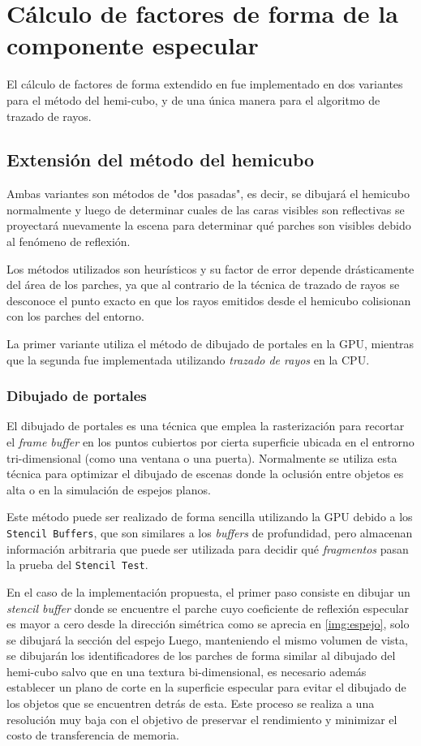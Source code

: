 \section{Cálculo de factores de forma de la componente especular}

El cálculo de factores de forma extendido en fue implementado en dos variantes para el método del hemi-cubo, y de una única manera para el algoritmo de trazado de rayos.

\subsection{Extensión del método del hemicubo}
Ambas variantes son métodos de "dos pasadas", es decir, se dibujará el hemicubo normalmente y luego de determinar cuales de las caras visibles son reflectivas se proyectará nuevamente la escena para determinar qué parches son visibles debido al fenómeno de reflexión.

Los métodos utilizados son heurísticos y su factor de error depende drásticamente del área de los parches, ya que al contrario de la técnica de trazado de rayos se desconoce el punto exacto en que los rayos emitidos desde el hemicubo colisionan con los parches del entorno.

La primer variante utiliza el método de dibujado de portales en la GPU, mientras que la segunda fue implementada utilizando \textit{trazado de rayos} en la CPU.

\subsubsection{Dibujado de portales}

El dibujado de portales es una técnica que emplea la rasterización para recortar el \textit{frame buffer} en los puntos cubiertos por cierta superficie ubicada en el entrorno tri-dimensional (como una ventana o una puerta). Normalmente se utiliza esta técnica para optimizar el dibujado de escenas donde la oclusión entre objetos es alta o en la simulación de espejos planos.

Este método puede ser realizado de forma sencilla utilizando la GPU debido a los \verb|Stencil Buffers|, que son similares a los \textit{buffers} de profundidad, pero almacenan información arbitraria que puede ser utilizada para decidir qué \textit{fragmentos} pasan la prueba del \verb|Stencil Test|.

En el caso de la implementación propuesta, el primer paso consiste en dibujar un \textit{stencil buffer} donde se encuentre el parche cuyo coeficiente de reflexión especular es mayor a cero desde la dirección simétrica como se aprecia en \ref{img:espejo}, solo se dibujará la sección del espejo  Luego, manteniendo el mismo volumen de vista, se dibujarán los identificadores de los parches de forma similar al dibujado del hemi-cubo salvo que en una textura bi-dimensional, es necesario además establecer un plano de corte en la superficie especular para evitar el dibujado de los objetos que se encuentren detrás de esta. Este proceso se realiza a una resolución muy baja con el objetivo de preservar el rendimiento y minimizar el costo de transferencia de memoria.

